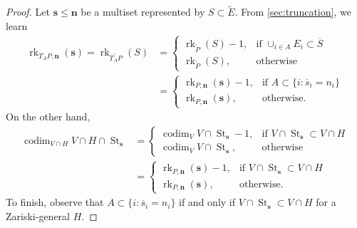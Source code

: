 \documentclass[11pt]{article}
\theoremstyle{definition}
\numberwithin{equation}{section}
\DeclareMathOperator{\St}{St}
\DeclareMathOperator{\rk}{rk}
\DeclareMathOperator{\codim}{codim}
\begin{document}
\begin{proof}
  Let $\mathbf s \leq \mathbf n$ be a multiset represented by $S \subset \widetilde E$.
  From \cref{sec:truncation}, we learn
  \begin{align*}
    \rk_{T_A P, \mathbf n}(\mathbf s) = \rk_{\widetilde{T_A P}}(S)
    &=  \begin{cases} \rk_{\widetilde P}(S) - 1, & \text{if $\cup_{i \in A} E_i \subset \overline S$} \\
      \rk_{\widetilde P}(S), & \text{otherwise}
                               \end{cases}\\
                               &= \begin{cases}
                                 \rk_{P, \mathbf n}(\mathbf s) - 1, & \text{if $A \subset \{i : \overline s_i = n_i\}$} \\
                                 \rk_{P,\mathbf n}(\mathbf s), & \text{otherwise.}
                                 \end{cases}
  \end{align*}
  On the other hand,
  \begin{align*}
    \codim_{V \cap H} V \cap H \cap \St_{\mathbf s}
    &= \begin{cases}
      \codim_V V \cap \St_{\mathbf s} - 1, & \text{if $V \cap \St_{\mathbf s} \subset V \cap H$} \\
      \codim_V V \cap \St_{\mathbf s}, & \text{otherwise}
    \end{cases}\\
    &= \begin{cases}
      \rk_{P, \mathbf n}(\mathbf s) - 1, & \text{if $V \cap \St_{\mathbf s} \subset V \cap H$} \\
      \rk_{P, \mathbf n}(\mathbf s), & \text{otherwise.}
     \end{cases}                                  
   \end{align*}
   To finish, observe that $A \subset \{i : \overline s_i = n_i\}$ if and only if  $V \cap \St_{\mathbf s} \subset V \cap H$ for a Zariski-general $H$.
\end{proof}
\end{document}

